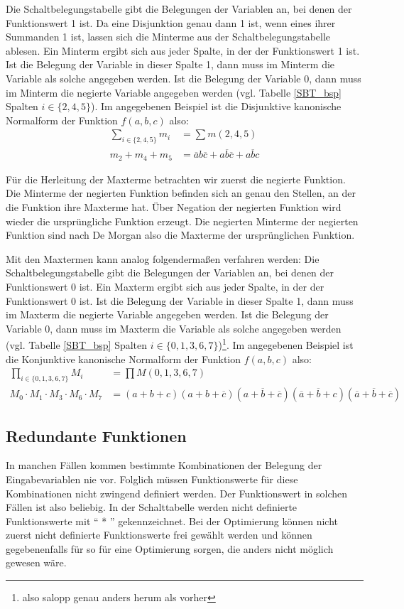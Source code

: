 Die Schaltbelegungstabelle gibt die Belegungen der Variablen an, bei denen der Funktionswert 1 ist. Da eine Disjunktion genau dann 1 ist, wenn eines ihrer Summanden 1 ist, lassen sich die Minterme aus der Schaltbelegungstabelle ablesen. Ein Minterm ergibt sich aus jeder Spalte, in der der Funktionswert 1 ist. Ist die Belegung der Variable in dieser Spalte 1, dann muss im Minterm die Variable als solche angegeben werden. Ist die Belegung der Variable 0, dann muss im Minterm die negierte Variable angegeben werden (vgl. Tabelle \ref{SBT_bsp} Spalten $i \in \{2, 4, 5\}$). Im angegebenen Beispiel ist die Disjunktive kanonische Normalform der Funktion $f(a,b,c)$ also:
\begin{align*}
 \sum_{i \in \{2, 4, 5\}} m_i &= \sum m(2, 4, 5) \\
m_2 + m_4 + m_5 &= \overline{a}b\overline{c} + a\overline{b}\overline{c} + a\overline{b}c
\end{align*}

Für die Herleitung der Maxterme betrachten wir zuerst die negierte Funktion. Die Minterme der negierten Funktion befinden sich an genau den Stellen, an der die Funktion ihre Maxterme hat. Über Negation der negierten Funktion wird wieder die ursprüngliche Funktion erzeugt. Die negierten Minterme der negierten Funktion sind nach De Morgan also die Maxterme der ursprünglichen Funktion.

Mit den Maxtermen kann analog folgendermaßen verfahren werden: Die Schaltbelegungstabelle gibt die Belegungen der Variablen an, bei denen der Funktionswert 0 ist. Ein Maxterm ergibt sich aus jeder Spalte, in der der Funktionswert 0 ist. Ist die Belegung der Variable in dieser Spalte 1, dann muss im Maxterm die negierte Variable angegeben werden. Ist die Belegung der Variable 0, dann muss im Maxterm die Variable als solche angegeben werden (vgl. Tabelle \ref{SBT_bsp} Spalten $i \in \{0, 1, 3, 6, 7\}$)\footnote{also salopp genau anders herum als vorher}. Im angegebenen Beispiel ist die Konjunktive kanonische Normalform der Funktion $f(a,b,c)$ also:
\begin{align*}
 \prod_{i \in \{0, 1, 3, 6, 7\}} M_i &= \prod M(0, 1, 3, 6, 7) \\
M_0 \cdot M_1 \cdot M_3 \cdot M_6 \cdot M_7 &= (a + b + c)(a + b + \overline{c})(a + \overline{b} + \overline{c})(\overline{a} + \overline{b} + c)(\overline{a} + \overline{b} + \overline{c})
\end{align*}

\subsection{Redundante Funktionen}
In manchen Fällen kommen bestimmte Kombinationen der Belegung der Eingabevariablen nie vor. Folglich müssen Funktionswerte für diese Kombinationen nicht zwingend definiert werden. Der Funktionswert in solchen Fällen ist also beliebig. In der Schalttabelle werden nicht definierte Funktionswerte mit "` * "' gekennzeichnet. Bei der Optimierung können nicht zuerst nicht definierte Funktionswerte frei gewählt werden und können gegebenenfalls für so für eine Optimierung sorgen, die anders nicht möglich gewesen wäre.


